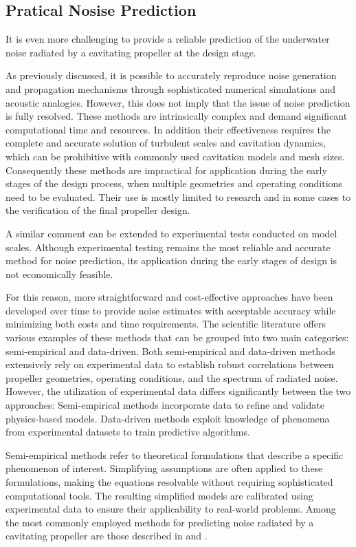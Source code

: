 \subsection{Pratical Nosise Prediction}

It is even more challenging to provide a reliable prediction of the underwater noise radiated by a cavitating propeller at the design stage.

As previously discussed, it is possible to accurately reproduce noise generation and propagation mechanisms through sophisticated numerical simulations and acoustic analogies.
However, this does not imply that the issue of noise prediction is fully resolved. These methods are intrinsically complex and demand significant computational time and resources. In addition their effectiveness requires the complete and accurate solution of turbulent scales and cavitation dynamics, which can be prohibitive with commonly used cavitation models and mesh sizes. Consequently these methods are impractical for application during the early stages of the design process, when multiple geometries and operating conditions need to be evaluated. Their use is mostly limited to research and in some cases to the verification of the final propeller design.

A similar comment can be extended to experimental tests conducted on model scales. Although experimental testing remains the most reliable and accurate method for noise prediction, its application during the early stages of design is not economically feasible.

For this reason, more straightforward and cost-effective approaches have been developed over time to provide noise estimates with acceptable accuracy while minimizing both costs and time requirements. 
The scientific literature offers various examples of these methods that can be grouped into two main categories: semi-empirical and data-driven.
Both semi-empirical and data-driven methods extensively rely on experimental data to establish robust correlations between propeller geometries, operating conditions, and the spectrum of radiated noise. However, the utilization of experimental data differs significantly between the two approaches: Semi-empirical methods incorporate data to refine and validate physics-based models. Data-driven methods exploit knowledge of phenomena from experimental datasets to train predictive algorithms.

Semi-empirical methods refer to theoretical formulations that describe a specific phenomenon of interest. Simplifying assumptions are often applied to these formulations, making the equations resolvable without requiring sophisticated computational tools. The resulting simplified models are calibrated using experimental data to ensure their applicability to real-world problems. Among the most commonly employed methods for predicting noise radiated by a cavitating propeller are those described in \cite{ETV_JMSE} and \cite{Brown1999}.

